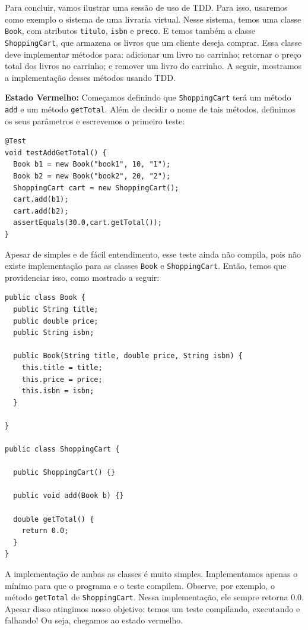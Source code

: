 \documentclass[
  11pt,
  twoside]{book}
\newcommand{\passthrough}[1]{#1}
\begin{document}
Para concluir, vamos ilustrar uma sessão de uso de TDD. Para isso,
usaremos como exemplo o sistema de uma livraria virtual. Nesse sistema,
temos uma classe \passthrough{\lstinline!Book!}, com atributos
\passthrough{\lstinline!titulo!}, \passthrough{\lstinline!isbn!} e
\passthrough{\lstinline!preco!}. E temos também a classe
\passthrough{\lstinline!ShoppingCart!}, que armazena os livros que um
cliente deseja comprar. Essa classe deve implementar métodos para:
adicionar um livro no carrinho; retornar o preço total dos livros no
carrinho; e remover um livro do carrinho. A seguir, mostramos a
implementação desses métodos usando TDD.

\textbf{Estado Vermelho:} Começamos definindo que
\passthrough{\lstinline!ShoppingCart!} terá um método
\passthrough{\lstinline!add!} e um método
\passthrough{\lstinline!getTotal!}. Além de decidir o nome de tais
métodos, definimos os seus parâmetros e escrevemos o primeiro teste:

\begin{lstlisting}
@Test
void testAddGetTotal() {
  Book b1 = new Book("book1", 10, "1");
  Book b2 = new Book("book2", 20, "2");
  ShoppingCart cart = new ShoppingCart();
  cart.add(b1);
  cart.add(b2);
  assertEquals(30.0,cart.getTotal());
}
\end{lstlisting}

Apesar de simples e de fácil entendimento, esse teste ainda não compila,
pois não existe implementação para as classes
\passthrough{\lstinline!Book!} e \passthrough{\lstinline!ShoppingCart!}.
Então, temos que providenciar isso, como mostrado a seguir:

\begin{lstlisting}
public class Book {
  public String title;
  public double price;
  public String isbn;

  public Book(String title, double price, String isbn) {
    this.title = title;
    this.price = price;
    this.isbn = isbn;
  }

}

public class ShoppingCart {

  public ShoppingCart() {}

  public void add(Book b) {}

  double getTotal() {
    return 0.0;
  }
}
\end{lstlisting}

A implementação de ambas as classes é muito simples. Implementamos
apenas o mínimo para que o programa e o teste compilem. Observe, por
exemplo, o método \passthrough{\lstinline!getTotal!} de
\passthrough{\lstinline!ShoppingCart!}. Nessa implementação, ele sempre
retorna 0.0. Apesar disso atingimos nosso objetivo: temos um teste
compilando, executando e falhando! Ou seja, chegamos ao estado vermelho.
\end{document}
